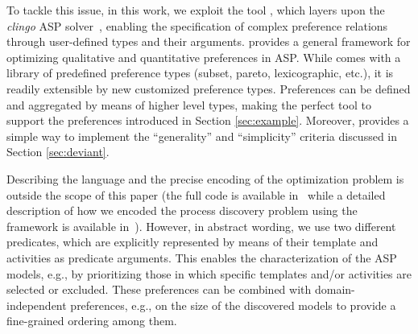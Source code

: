 To tackle this issue, in this work, we exploit the \asprin tool \cite{DBLP:conf/aaai/BrewkaD0S15}, which layers upon the \emph{clingo} \ac{ASP} solver~\cite{clingo}, enabling the specification of complex preference relations through user-defined  types and their arguments. 
%
%
\asprin provides a general framework for optimizing qualitative and quantitative preferences in \ac{ASP}. %
While \asprin comes with a library of predefined preference types (subset, pareto, lexicographic, etc.), it is readily extensible by new customized preference types. Preferences can be defined and aggregated by means of higher level types, making \asprin the perfect tool to support the preferences introduced in Section \ref{sec:example}. Moreover, %
\asprin provides a simple way to implement the ``generality'' and ``simplicity'' criteria discussed in Section \ref{sec:deviant}.



Describing the \asprin language and the precise encoding of the optimization problem is outside the scope of this paper (the full code is available in~\cite{zenodo:experiments} while a detailed description of how we encoded the process discovery problem using the \asprin framework is available in~\cite{Chesani:2022wa}). However, in abstract wording, we use two different predicates,
which are explicitly represented by means of their template and activities as predicate arguments.
%
This enables the characterization of the \ac{ASP} models, e.g., by prioritizing those in which specific templates and/or activities are selected or excluded. These preferences can be combined with domain-independent preferences, e.g., on the size of the discovered models to provide a fine-grained ordering among them.
